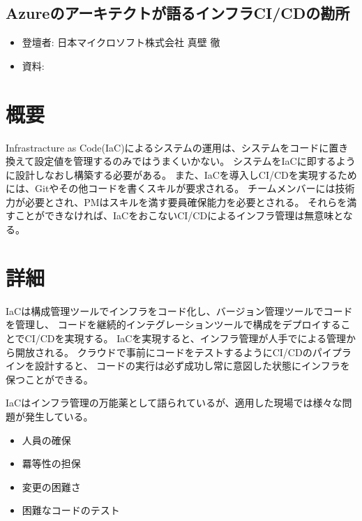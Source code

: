 \begin{center}
  \section*{Azureのアーキテクトが語るインフラCI/CDの勘所}
\end{center}


\begin{flushright}
  \begin{itemize}
  \item   登壇者: 日本マイクロソフト株式会社 真壁 徹
  \item 資料: 
  \end{itemize}
\end{flushright}

\section*{概要}

Infrastracture as Code(IaC)によるシステムの運用は、システムをコードに置き換えて設定値を管理するのみではうまくいかない。
システムをIaCに即するように設計しなおし構築する必要がある。
また、IaCを導入しCI/CDを実現するためには、Gitやその他コードを書くスキルが要求される。
チームメンバーには技術力が必要とされ、PMはスキルを満す要員確保能力を必要とされる。
それらを満すことができなければ、IaCをおこないCI/CDによるインフラ管理は無意味となる。

\section*{詳細}

IaCは構成管理ツールでインフラをコード化し、バージョン管理ツールでコードを管理し、
コードを継続的インテグレーションツールで構成をデプロイすることでCI/CDを実現する。
IaCを実現すると、インフラ管理が人手でによる管理から開放される。
クラウドで事前にコードをテストするようにCI/CDのパイプラインを設計すると、
コードの実行は必ず成功し常に意図した状態にインフラを保つことができる。

IaCはインフラ管理の万能薬として語られているが、適用した現場では様々な問題が発生している。\\

\begin{itemize}
\item 人員の確保
\item 羃等性の担保
\item 変更の困難さ
\item 困難なコードのテスト
\end{itemize}

